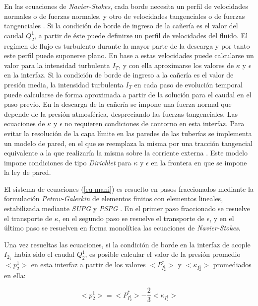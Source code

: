 En las ecuaciones de \textit{Navier-Stokes}, cada borde necesita un perfil de velocidades normales o de fuerzas normales,
y otro de velocidades tangenciales o de fuerzas tangenciales \cite{gunzburger}.
Si la condición de borde de ingreso de la cañería es el valor del caudal $Q_2^1$,
a partir de éste puede definirse un perfil de velocidades del fluido.
El regímen de flujo es turbulento durante la mayor parte de la descarga y por tanto este perfil puede suponerse plano.
En base a estas velocidades puede calcularse un valor para la intensidad turbulenta $I_T$,
y con ella aproximarse los valores de $\kappa$ y $\epsilon$ en la interfaz.
Si la condición de borde de ingreso a la cañería es el valor de presión media,
la intensidad turbulenta $I_T$ en cada paso de evolución temporal puede calcularse de forma aproximada a partir de la solución para el caudal en el paso previo.
En la descarga de la cañería se impone una fuerza normal que depende de la presión atmosférica,
despreciando las fuerzas tangenciales.
Las ecuaciones de $\kappa$ y $\epsilon$ no requieren condiciones de contorno en esta interfaz.
Para evitar la resolución de la capa límite en las paredes de las tuberías se implementa un modelo de pared,
en el que se reemplaza la misma por una tracción tangencial equivalente a la que realizaría la misma sobre la corriente externa
\cite{k-e}.
Este modelo impone condiciones de tipo \textit{Dirichlet} para $\kappa$ y $\epsilon$ en la frontera en que se impone la ley de pared.

El sistema de ecuaciones (\ref{eq-mani}) es resuelto en pasos fraccionados \cite{lew} mediante la formulación \textit{Petrov-Galerkin} \cite{galerkin} de elementos finitos con elementos lineales, 
estabilizada mediante \textit{SUPG} \cite{supg} y \textit{PSPG} \cite{pspg}.
En el primer paso fraccionado se resuelve el transporte de $\kappa$,
en el segundo paso se resuelve el transporte de $\epsilon$,
y en el último paso se resuelven en forma monolítica las ecuaciones de \textit{Navier-Stokes}.

Una vez resueltas las ecuaciones,
si la condición de borde en la interfaz de acople $I_{2_1}$ había sido el caudal $Q_2^1$,
es posible calcular el valor de la presión promedio $<p_2^1>$ en esta interfaz
a partir de los valores $<P^*_{I_2^1}>$ y $<\kappa_{I_2^1}>$ promediados en ella:

\begin{equation}
<p_2^1> = <P^*_{I_2^1}> - \frac {2}{3} <\kappa_{I_2^1}>
\end{equation}


